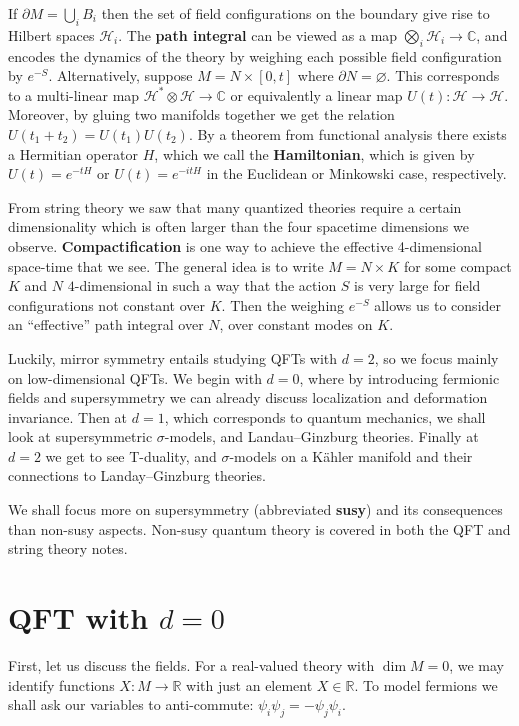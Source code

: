 \documentclass{report}
\theoremstyle{plain}
\theoremstyle{definition}
\theoremstyle{remark}
\newcommand{\di}{\partial}
\newcommand{\bC}{\mathbb{C}}
\newcommand{\bR}{\mathbb{R}}
\newcommand{\mc}{\mathcal}
\newcommand{\sg}{\sigma}
\newcommand{\ten}{\otimes}
\begin{document}
If $\di M = \bigcup_i B_i$ then the set of field configurations on the
boundary give rise to Hilbert spaces $\mc H_i$. The {\bf path
  integral} can be viewed as a map $\bigotimes_i\mc H_i\to \bC$, and
encodes the dynamics of the theory by weighing each possible field
configuration by $e^{-S}$. Alternatively, suppose $M=N\times [0,t]$
where $\di N = \varnothing$. This corresponds to a multi-linear map
$\mc H^*\ten\mc H\to\bC$ or equivalently a linear map $U(t)\colon\mc
H\to \mc H$. Moreover, by gluing two manifolds together we get the
relation $U(t_1+t_2)=U(t_1)U(t_2)$. By a theorem from functional
analysis there exists a Hermitian operator $H$, which we call the {\bf
  Hamiltonian}, which is given by $U(t) = e^{-tH}$ or $U(t) =
e^{-itH}$ in the Euclidean or Minkowski case, respectively.

From string theory we saw that many quantized theories require a
certain dimensionality which is often larger than the four spacetime
dimensions we observe. {\bf Compactification} is one way to achieve
the effective 4-dimensional space-time that we see. The general idea
is to write $M = N \times K$ for some compact $K$ and $N$
$4$-dimensional in such a way that the action $S$ is very large for
field configurations not constant over $K$. Then the weighing $e^{-S}$
allows us to consider an ``effective'' path integral over $N$, over
constant modes on $K$.

Luckily, mirror symmetry entails studying QFTs with $d=2$, so we focus
mainly on low-dimensional QFTs. We begin with $d=0$, where by
introducing fermionic fields and supersymmetry we can already discuss
localization and deformation invariance. Then at $d=1$, which
corresponds to quantum mechanics, we shall look at supersymmetric
$\sg$-models, and Landau--Ginzburg theories. Finally at $d=2$ we get
to see T-duality, and $\sg$-models on a K\"ahler manifold and their
connections to Landay--Ginzburg theories.

We shall focus more on supersymmetry (abbreviated {\bf susy}) and its
consequences than non-susy aspects. Non-susy quantum theory is covered
in both the QFT and string theory notes.

\section{QFT with \texorpdfstring{$d=0$}{d=0}}
First, let us discuss the fields. For a real-valued theory with $\dim
M=0$, we may identify functions $X:M\to\bR$ with just an element
$X\in\bR$. To model fermions we shall ask our variables to
anti-commute: $\psi_i\psi_j=-\psi_j\psi_i$.
\end{document}
